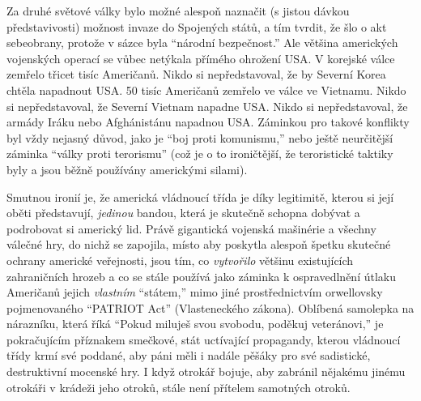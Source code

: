 \documentclass{book}
\begin{document}
Za druhé světové války bylo možné alespoň naznačit (s jistou dávkou představivosti) možnost invaze do Spojených států, a tím tvrdit, že šlo o akt sebeobrany, protože v sázce byla \enquote{národní bezpečnost.} Ale většina amerických vojenských operací se vůbec netýkala přímého ohrožení USA. V korejské válce zemřelo třicet tisíc Američanů. Nikdo si nepředstavoval, že by Severní Korea chtěla napadnout USA. 50 tisíc Američanů zemřelo ve válce ve Vietnamu. Nikdo si nepředstavoval, že Severní Vietnam napadne USA. Nikdo si nepředstavoval, že armády Iráku nebo Afghánistánu napadnou USA. Záminkou pro takové konflikty byl vždy nejasný důvod, jako je \enquote{boj proti komunismu,} nebo ještě neurčitější záminka \enquote{války proti terorismu} (což je o to ironičtější, že teroristické taktiky byly a jsou běžně používány americkými silami).

Smutnou ironií je, že americká vládnoucí třída je díky legitimitě, kterou si její oběti představují, \emph{jedinou} bandou, která je skutečně schopna dobývat a podrobovat si americký lid. Právě gigantická vojenská mašinérie a všechny válečné hry, do nichž se zapojila, místo aby poskytla alespoň špetku skutečné ochrany americké veřejnosti, jsou tím, co \emph{vytvořilo} většinu existujících zahraničních hrozeb a co se stále používá jako záminka k ospravedlnění útlaku Američanů jejich \emph{vlastním} \enquote{státem,} mimo jiné prostřednictvím orwellovsky pojmenovaného \enquote{PATRIOT Act} (Vlasteneckého zákona). Oblíbená samolepka na nárazníku, která říká \enquote{Pokud miluješ svou svobodu, poděkuj veteránovi,} je pokračujícím příznakem smečkové, stát uctívající propagandy, kterou vládnoucí třídy krmí své poddané, aby páni měli i nadále pěšáky pro své sadistické, destruktivní mocenské hry. I když otrokář bojuje, aby zabránil nějakému jinému otrokáři v krádeži jeho otroků, stále není přítelem samotných otroků.
\end{document}
